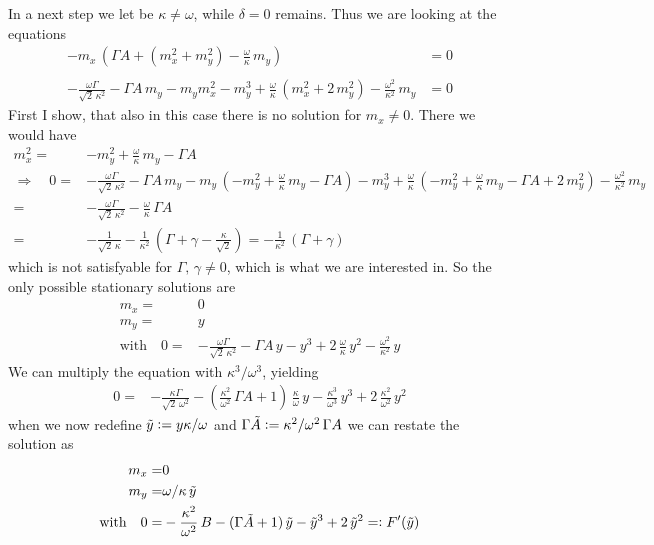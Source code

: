 \documentclass{article}
\begin{document}
In a next step we let be $\kappa\neq\omega$, while $\delta=0$ remains. Thus we are looking at the equations
\begin{align*}
    -m_x\,\left(\Gamma A+( m_x^2+ m_y^2)-\frac{\omega}{\kappa}\,m_y\right)  &=0\\\\
    -\frac{\omega\Gamma}{\sqrt{2}\,\kappa^2}-\Gamma A\,m_y    -m_ym_x^2- m_y^3+\frac{\omega}{\kappa}\,(m_x^2+2\,m_y^2)-\frac{\omega^2}{\kappa^2}\,m_y  &=0
\end{align*}
First I show, that also in this case there is no solution for $m_x\neq0$. There we would have
\begin{align*}
    m_x^2=&-m_y^2+\frac{\omega}{\kappa}\,m_y-\Gamma A \\
    \Rightarrow\quad0=&-\frac{\omega\Gamma}{\sqrt{2}\,\kappa^2}-\Gamma A\,m_y    -m_y\,(-m_y^2+\frac{\omega}{\kappa}\,m_y-\Gamma A)- m_y^3+\frac{\omega}{\kappa}\,(-m_y^2+\frac{\omega}{\kappa}\,m_y-\Gamma A+2\,m_y^2)-\frac{\omega^2}{\kappa^2}\,m_y  \\
    =&-\frac{\omega\Gamma}{\sqrt{2}\,\kappa^2}-\frac{\omega}{\kappa}\,\Gamma A\\
    =&-\frac{1}{\sqrt{2}\,\kappa}-\frac{1}{\kappa^2}\,(\Gamma+\gamma-\frac{\kappa}{\sqrt{2}})=-\frac{1}{\kappa^2}\,(\Gamma+\gamma)
\end{align*} 
which is not satisfyable for $\Gamma,\,\gamma\neq0$, which is what we are interested in. So the only possible stationary solutions are
\begin{align*}
    m_x=&0\\
    m_y=&y\\
    \text{with}\quad0=&-\frac{\omega\Gamma}{\sqrt{2}\,\kappa^2}-\Gamma A\,y    - y^3+2\,\frac{\omega}{\kappa}\,y^2-\frac{\omega^2}{\kappa^2}\,y  
\end{align*}
We can multiply the equation with $\kappa^3/\omega^3$, yielding
\begin{align*}
    0=&-\frac{\kappa\Gamma}{\sqrt{2}\,\omega^2}-(\frac{\kappa^2}{\omega^2}\,\Gamma A+1)\,\frac{\kappa}{\omega}\,y    - \frac{\kappa^3}{\omega^3}\,y^3+2\,\frac{\kappa^2}{\omega^2}\,y^2 
\end{align*}
when we now redefine $\tilde{y}\vcentcolon=y\kappa/\omega$ and $\Gamma\tilde{A}\vcentcolon=\kappa^2/\omega^2\,\Gamma A$ we can restate the solution as
\begin{align*}
    m_x=&0\\
    m_y=&\omega/\kappa\,\tilde{y}\\
    \text{with}\quad0=&-\frac{\kappa^2}{\omega^2}\,B-(\Gamma \tilde{A}+1)\,\tilde{y}    - \tilde{y}^3+2\,\tilde{y}^2=\vcentcolon F'(\tilde{y})
\end{align*}
\end{document}
